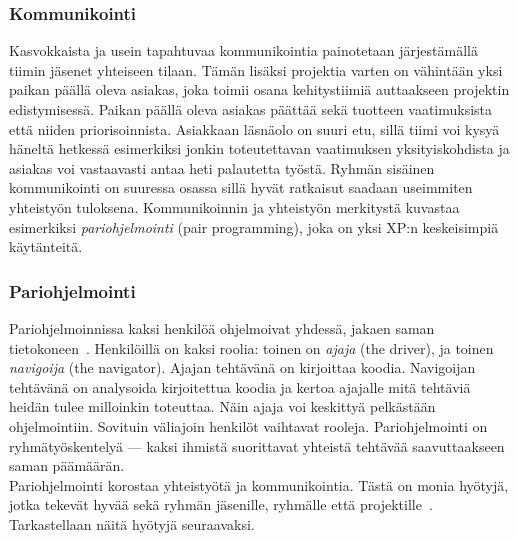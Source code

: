\documentclass[finnish]{../tktltiki2}
\theoremstyle{definition}
\theoremstyle{remark}
\begin{document}
\subsubsection{Kommunikointi}

Kasvokkaista ja usein tapahtuvaa kommunikointia painotetaan järjestämällä tiimin jäsenet yhteiseen tilaan. Tämän lisäksi projektia varten on vähintään yksi paikan päällä oleva asiakas, joka toimii osana kehitystiimiä auttaakseen projektin edistymisessä. Paikan päällä oleva asiakas päättää sekä tuotteen vaatimuksista että niiden priorisoinnista. Asiakkaan läsnäolo on suuri etu, sillä tiimi voi kysyä häneltä hetkessä esimerkiksi jonkin toteutettavan vaatimuksen yksityiskohdista ja asiakas voi vastaavasti antaa heti palautetta työstä. Ryhmän sisäinen kommunikointi on suuressa osassa sillä hyvät ratkaisut saadaan useimmiten yhteistyön tuloksena. Kommunikoinnin ja yhteistyön merkitystä kuvastaa esimerkiksi \emph{pariohjelmointi} (pair programming), joka on yksi XP:n keskeisimpiä käytänteitä.

\subsubsection{Pariohjelmointi}

Pariohjelmoinnissa kaksi henkilöä ohjelmoivat yhdessä, jakaen saman 
tietokoneen~\cite{Shore:2007:AAD:1407480}. Henkilöillä on kaksi roolia: toinen on \emph{ajaja} (the driver), ja toinen 
\emph{navigoija} (the navigator). Ajajan tehtävänä on
kirjoittaa koodia. Navigoijan tehtävänä on analysoida
kirjoitettua koodia ja kertoa ajajalle mitä tehtäviä heidän tulee 
milloinkin 
toteuttaa. Näin ajaja voi keskittyä pelkästään ohjelmointiin. Sovituin 
väliajoin henkilöt vaihtavat rooleja. Pariohjelmointi on
ryhmätyöskentelyä --- kaksi ihmistä suorittavat yhteistä tehtävää 
saavuttaakseen saman päämäärän.\\

Pariohjelmointi korostaa yhteistyötä ja kommunikointia. Tästä on monia 
hyötyjä, jotka tekevät hyvää sekä ryhmän jäsenille, ryhmälle että 
projektille~\cite{Begel:2008:PPW:1414004.1414026}. Tarkastellaan näitä 
hyötyjä seuraavaksi. 

\pagebreak
\end{document}
